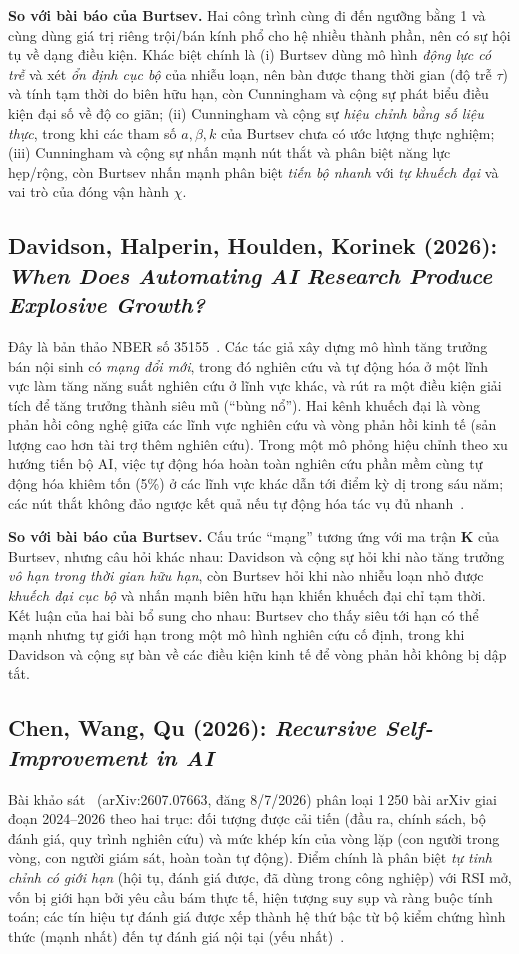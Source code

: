 \documentclass[12pt,a4paper,openany]{report}
\numberwithin{equation}{chapter}   %
\theoremstyle{definition}
\newcommand{\en}[1]{\textit{#1}}   %
\begin{document}
\textbf{So với bài báo của Burtsev.} Hai công trình cùng đi đến ngưỡng bằng 1 và cùng dùng giá trị riêng trội/bán kính phổ cho hệ nhiều thành phần, nên có sự hội tụ về dạng điều kiện. Khác biệt chính là (i) Burtsev dùng mô hình \emph{động lực có trễ} và xét \emph{ổn định cục bộ} của nhiễu loạn, nên bàn được thang thời gian (độ trễ $\tau$) và tính tạm thời do biên hữu hạn, còn Cunningham và cộng sự phát biểu điều kiện đại số về độ co giãn; (ii) Cunningham và cộng sự \emph{hiệu chỉnh bằng số liệu thực}, trong khi các tham số $a,\beta,k$ của Burtsev chưa có ước lượng thực nghiệm; (iii) Cunningham và cộng sự nhấn mạnh nút thắt và phân biệt năng lực hẹp/rộng, còn Burtsev nhấn mạnh phân biệt \emph{tiến bộ nhanh} với \emph{tự khuếch đại} và vai trò của đóng vận hành $\chi$.

\subsection{Davidson, Halperin, Houlden, Korinek (2026): \en{When Does Automating AI Research Produce Explosive Growth?}}
Đây là bản thảo NBER số 35155~\cite{davidson2026}. Các tác giả xây dựng mô hình tăng trưởng bán nội sinh có \emph{mạng đổi mới}, trong đó nghiên cứu và tự động hóa ở một lĩnh vực làm tăng năng suất nghiên cứu ở lĩnh vực khác, và rút ra một điều kiện giải tích để tăng trưởng thành siêu mũ (``bùng nổ''). Hai kênh khuếch đại là vòng phản hồi công nghệ giữa các lĩnh vực nghiên cứu và vòng phản hồi kinh tế (sản lượng cao hơn tài trợ thêm nghiên cứu). Trong một mô phỏng hiệu chỉnh theo xu hướng tiến bộ AI, việc tự động hóa hoàn toàn nghiên cứu phần mềm cùng tự động hóa khiêm tốn (5\%) ở các lĩnh vực khác dẫn tới điểm kỳ dị trong sáu năm; các nút thắt không đảo ngược kết quả nếu tự động hóa tác vụ đủ nhanh~\cite{davidson2026}.

\textbf{So với bài báo của Burtsev.} Cấu trúc ``mạng'' tương ứng với ma trận $\mathbf{K}$ của Burtsev, nhưng câu hỏi khác nhau: Davidson và cộng sự hỏi khi nào tăng trưởng \emph{vô hạn trong thời gian hữu hạn}, còn Burtsev hỏi khi nào nhiễu loạn nhỏ được \emph{khuếch đại cục bộ} và nhấn mạnh biên hữu hạn khiến khuếch đại chỉ tạm thời. Kết luận của hai bài bổ sung cho nhau: Burtsev cho thấy siêu tới hạn có thể mạnh nhưng tự giới hạn trong một mô hình nghiên cứu cố định, trong khi Davidson và cộng sự bàn về các điều kiện kinh tế để vòng phản hồi không bị dập tắt.

\subsection{Chen, Wang, Qu (2026): \en{Recursive Self-Improvement in AI}}
Bài khảo sát~\cite{chen2026} (arXiv:2607.07663, đăng 8/7/2026) phân loại 1\,250 bài arXiv giai đoạn 2024--2026 theo hai trục: đối tượng được cải tiến (đầu ra, chính sách, bộ đánh giá, quy trình nghiên cứu) và mức khép kín của vòng lặp (con người trong vòng, con người giám sát, hoàn toàn tự động). Điểm chính là phân biệt \emph{tự tinh chỉnh có giới hạn} (hội tụ, đánh giá được, đã dùng trong công nghiệp) với RSI mở, vốn bị giới hạn bởi yêu cầu bám thực tế, hiện tượng suy sụp và ràng buộc tính toán; các tín hiệu tự đánh giá được xếp thành hệ thứ bậc từ bộ kiểm chứng hình thức (mạnh nhất) đến tự đánh giá nội tại (yếu nhất)~\cite{chen2026}.
\end{document}
